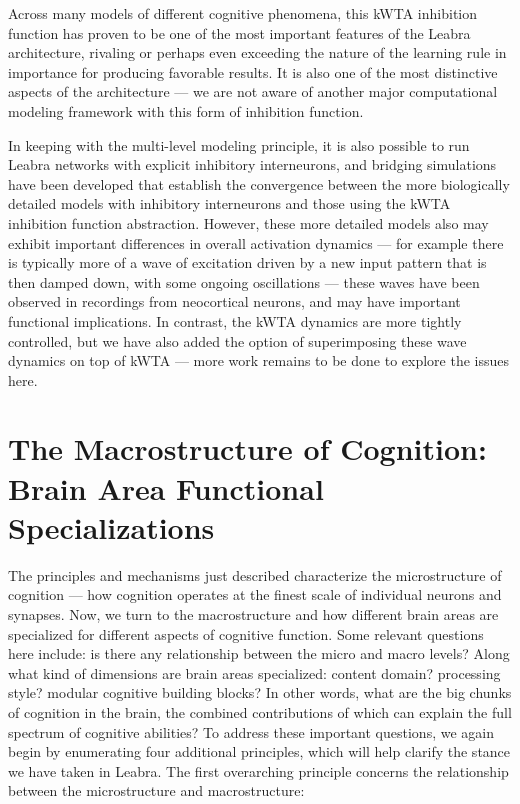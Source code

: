 \documentclass[11pt,twoside]{article}
\begin{document}
Across many models of different cognitive phenomena, this kWTA
inhibition function has proven to be one of the most important
features of the Leabra architecture, rivaling or perhaps even
exceeding the nature of the learning rule in importance for producing
favorable results.  It is also one of the most distinctive aspects of
the architecture --- we are not aware of another major computational
modeling framework with this form of inhibition function.

In keeping with the multi-level modeling principle, it is also
possible to run Leabra networks with explicit inhibitory interneurons,
and bridging simulations have been developed that establish the
convergence between the more biologically detailed models with
inhibitory interneurons and those using the kWTA inhibition function
abstraction.  However, these more detailed models also may exhibit
important differences in overall activation dynamics --- for example
there is typically more of a wave of excitation driven by a new input
pattern that is then damped down, with some ongoing oscillations ---
these waves have been observed in recordings from neocortical neurons,
and may have important functional implications.  In contrast, the kWTA
dynamics are more tightly controlled, but we have also added the
option of superimposing these wave dynamics on top of kWTA --- more
work remains to be done to explore the issues here.


\section{The Macrostructure of Cognition: Brain Area Functional Specializations}

The principles and mechanisms just described characterize the
microstructure of cognition --- how cognition operates at the finest
scale of individual neurons and synapses.  Now, we turn to the
macrostructure and how different brain areas are specialized for
different aspects of cognitive function.  Some relevant questions here
include: is there any relationship between the micro and macro levels?
Along what kind of dimensions are brain areas specialized: content
domain?  processing style?  modular cognitive building blocks?  In
other words, what are the big chunks of cognition in the brain, the
combined contributions of which can explain the full spectrum of
cognitive abilities?  To address these important questions, we again
begin by enumerating four additional principles, which will help
clarify the stance we have taken in Leabra.  The first overarching
principle concerns the relationship between the microstructure and
macrostructure:
\end{document}
